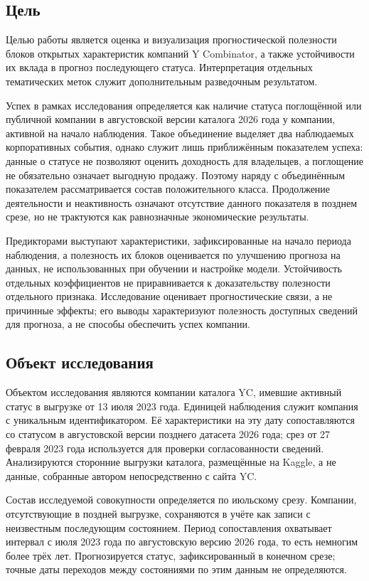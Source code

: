 \subsection{Цель}

Целью работы является оценка и визуализация прогностической полезности блоков открытых характеристик компаний Y Combinator, а также устойчивости их вклада в прогноз последующего статуса. Интерпретация отдельных тематических меток служит дополнительным разведочным результатом.

Успех в рамках исследования определяется как наличие статуса поглощённой или публичной компании в августовской версии каталога 2026 года у компании, активной на начало наблюдения. Такое объединение выделяет два наблюдаемых корпоративных события, однако служит лишь приближённым показателем успеха: данные о статусе не позволяют оценить доходность для владельцев, а поглощение не обязательно означает выгодную продажу. Поэтому наряду с объединённым показателем рассматривается состав положительного класса. Продолжение деятельности и неактивность означают отсутствие данного показателя в позднем срезе, но не трактуются как равнозначные экономические результаты.

Предикторами выступают характеристики, зафиксированные на начало периода наблюдения, а полезность их блоков оценивается по улучшению прогноза на данных, не использованных при обучении и настройке модели. Устойчивость отдельных коэффициентов не приравнивается к доказательству полезности отдельного признака. Исследование оценивает прогностические связи, а не причинные эффекты; его выводы характеризуют полезность доступных сведений для прогноза, а не способы обеспечить успех компании.

\subsection{Объект исследования}

Объектом исследования являются компании каталога YC, имевшие активный статус в выгрузке от 13 июля 2023 года. Единицей наблюдения служит компания с уникальным идентификатором. Её характеристики на эту дату сопоставляются со статусом в августовской версии позднего датасета 2026 года; срез от 27 февраля 2023 года используется для проверки согласованности сведений. Анализируются сторонние выгрузки каталога, размещённые на Kaggle, а не данные, собранные автором непосредственно с сайта YC.

Состав исследуемой совокупности определяется по июльскому срезу. Компании, отсутствующие в поздней выгрузке, сохраняются в учёте как записи с неизвестным последующим состоянием. Период сопоставления охватывает интервал с июля 2023 года по августовскую версию 2026 года, то есть немногим более трёх лет. Прогнозируется статус, зафиксированный в конечном срезе; точные даты переходов между состояниями по этим данным не определяются.

